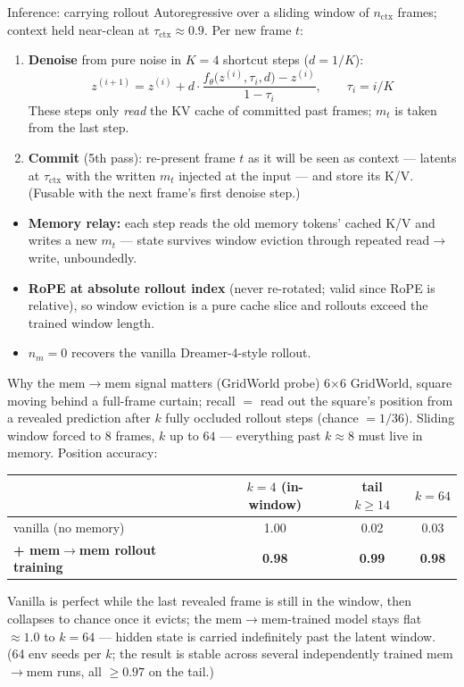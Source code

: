 \documentclass[10pt,aspectratio=169]{beamer}
\newcommand{\mem}{m}
\begin{document}
\begin{frame}{Inference: carrying rollout}
Autoregressive over a sliding window of $n_{\text{ctx}}$ frames; context held near-clean at $\tau_{\text{ctx}} \approx 0.9$.
Per new frame $t$:
\begin{enumerate}
  \item \textbf{Denoise} from pure noise in $K{=}4$ shortcut steps ($d = 1/K$):
  \[
  z^{(i+1)} = z^{(i)} + d \cdot \frac{f_\theta\big(z^{(i)}, \tau_i, d\big) - z^{(i)}}{1-\tau_i},
  \qquad \tau_i = i/K
  \]
  These steps only \emph{read} the KV cache of committed past frames; $\mem_t$ is taken from the last step.
  \item \textbf{Commit} (5th pass): re-present frame $t$ as it will be seen as context --- latents at
        $\tau_{\text{ctx}}$ with the written $\mem_t$ injected at the input --- and store its K/V.
        (Fusable with the next frame's first denoise step.)
\end{enumerate}
\medskip
\begin{itemize}
  \item \textbf{Memory relay:} each step reads the old memory tokens' cached K/V and writes a new $\mem_t$ ---
        state survives window eviction through repeated read$\to$write, unboundedly.
  \item \textbf{RoPE at absolute rollout index} (never re-rotated; valid since RoPE is relative), so window
        eviction is a pure cache slice and rollouts exceed the trained window length.
  \item $n_m = 0$ recovers the vanilla Dreamer-4-style rollout.
\end{itemize}
\end{frame}

\begin{frame}{Why the mem$\to$mem signal matters (GridWorld probe)}
6$\times$6 GridWorld, square moving behind a full-frame curtain; recall $=$ read out the square's position
from a revealed prediction after $k$ fully occluded rollout steps (chance $= 1/36$). Sliding window forced
to $8$ frames, $k$ up to $64$ --- everything past $k \approx 8$ must live in memory. Position accuracy:
\medskip
\begin{center}
\begin{tabular}{lccc}
\hline
 & $k = 4$ (in-window) & tail $k \geq 14$ & $k = 64$\\
\hline
vanilla (no memory)                     & 1.00 & 0.02 & 0.03\\
\textbf{+ mem$\to$mem rollout training} & \textbf{0.98} & \textbf{0.99} & \textbf{0.98}\\
\hline
\end{tabular}
\end{center}
\medskip
Vanilla is perfect while the last revealed frame is still in the window, then collapses to chance once it
evicts; the mem$\to$mem-trained model stays flat $\approx 1.0$ to $k = 64$ --- hidden state is carried
indefinitely past the latent window. (64 env seeds per $k$; the result is stable across several
independently trained mem$\to$mem runs, all $\ge 0.97$ on the tail.)
\end{frame}
\end{document}
